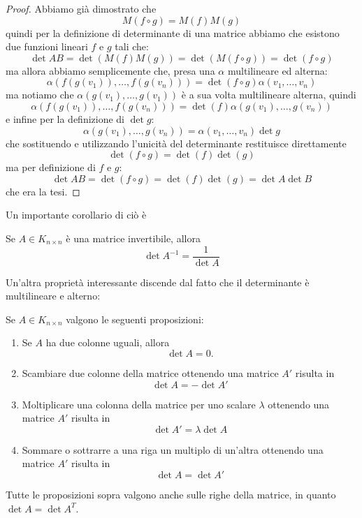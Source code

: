 \documentclass[11pt]{scrartcl}
\begin{document}
   	 \begin{proof}
   	 	Abbiamo già dimostrato che 
   	 	$$M(f\circ g)=M(f)M(g)$$
   	 	quindi per la definizione di determinante di una matrice abbiamo che esistono due funzioni lineari $f$ e $g$ tali che:
   	 	$$\det AB =\det(M(f)M(g))=\det(M(f\circ g))=\det(f\circ g)$$
   	 	ma allora abbiamo semplicemente che, presa una $\alpha$ multilineare ed alterna:
   	 	$$\alpha\left(f(g(v_1)),\dots,f(g(v_n))\right)=\det(f\circ g)\alpha(v_1,\dots,v_n)$$
   	 	ma notiamo che $\alpha(g(v_1),\dots,g(v_1))$ è a sua volta multilineare alterna, quindi
   	 	$$\alpha\left(f(g(v_1)),\dots,f(g(v_n))\right)=\det(f)\alpha(g(v_1),\dots,g(v_n))$$
   	 	e infine per la definizione di $\det g$:
   	 	$$\alpha(g(v_1),\dots,g(v_n))=\alpha(v_1,\dots,v_n)\det g$$
   	 	che sostituendo e utilizzando l'unicità del determinante restituisce direttamente
   	 	$$\det(f\circ g)=\det(f)\det(g)$$
   	 	ma per definizione di $f$ e $g$:
   	 	$$\det AB =\det(f\circ g)=\det(f)\det(g)=\det A\det B$$
   	 	che era la tesi.
   	 \end{proof}
   	 Un importante corollario di ciò è
   	 \begin{corollary}
   	 	Se $A\in K_{n\times n}$ è una matrice invertibile, allora
   	 	$$\det A^{-1}=\frac{1}{\det A}$$
   	 \end{corollary}
   	 Un'altra proprietà interessante discende dal fatto che il determinante è multilineare e alterno:
   	 \begin{lemma}
   	 	Se $A\in K_{n\times n}$ valgono le seguenti proposizioni:
   	 	\begin{enumerate}
   	 		\item Se $A$ ha due colonne uguali, allora 
   	 		$$\det A=0.$$
   	 		\item Scambiare due colonne della matrice ottenendo una matrice $A'$ risulta in
   	 		$$\det A = -\det A'$$
   	 		\item Moltiplicare una colonna della matrice per uno scalare $\lambda$ ottenendo una matrice $A'$ risulta in
   	 		$$\det A' = \lambda \det A$$
   	 		\item Sommare o sottrarre a una riga un multiplo di un'altra ottenendo una matrice $A'$ risulta in 
   	 		$$\det A = \det A'$$
   	 	\end{enumerate}
   	 	Tutte le proposizioni sopra valgono anche sulle righe della matrice, in quanto $\det A = \det A^T$.
   	 \end{lemma}
\end{document}
